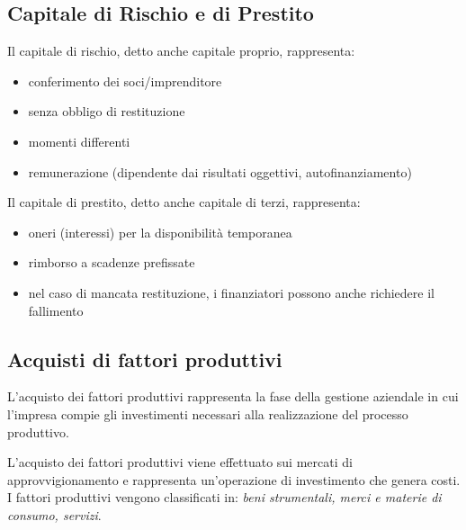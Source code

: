 \subsection{Capitale di Rischio e di Prestito}
Il capitale di rischio, detto anche capitale proprio, rappresenta:
\begin{itemize}
	\item conferimento dei soci/imprenditore
	\item senza obbligo di restituzione
	\item momenti differenti
	\item remunerazione (dipendente dai risultati oggettivi, autofinanziamento)
\end{itemize}
Il capitale di prestito, detto anche capitale di terzi, rappresenta:
\begin{itemize}
	\item oneri (interessi) per la disponibilità temporanea
	\item rimborso a scadenze prefissate
	\item nel caso di mancata restituzione, i finanziatori possono anche richiedere il fallimento
\end{itemize}

\subsection{Acquisti di fattori produttivi}

L’acquisto dei fattori produttivi rappresenta la fase della gestione aziendale in cui l’impresa compie gli investimenti necessari alla realizzazione del processo produttivo.

L’acquisto dei fattori produttivi viene effettuato sui mercati di approvvigionamento e rappresenta un’operazione di investimento che genera costi. I fattori produttivi vengono classificati in: \textit{beni strumentali, merci e materie di consumo, servizi}. 
